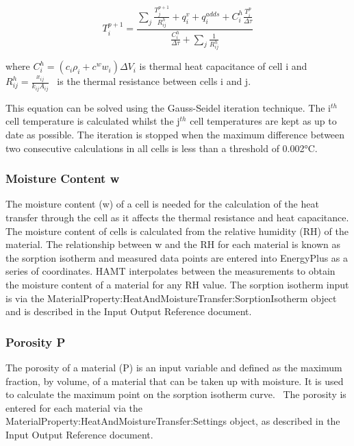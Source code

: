 \begin{equation}
T_i^{p + 1} = \frac{{\sum\nolimits_j {\frac{{T_j^{p + 1}}}{{R_{ij}^h}}}  + q_i^v + q_i^{adds} + C_i^h\frac{{T_i^p}}{{\Delta \tau }}}}{{\frac{{C_i^h}}{{\Delta \tau }} + \sum\nolimits_j {\frac{1}{{R_{ij}^h}}} }}
\label{eq:TemperatureIthCell}
\end{equation}

where \(C_i^h = \left( {{c_i}{\rho_i} + {c^w}{w_i}} \right)\Delta {V_i}\) is thermal heat capacitance of cell i and \(R_{ij}^h = \frac{x_{ij}}{k_{ij}A_{ij}}\) ~is the thermal resistance between cells i and j.

This equation can be solved using the Gauss-Seidel iteration technique. The i\(^{th}\) cell temperature is calculated whilst the j\(^{th}\) cell temperatures are kept as up to date as possible. The iteration is stopped when the maximum difference between two consecutive calculations in all cells is less than a threshold of 0.002°C.

\subsubsection{Moisture Content w}\label{moisture-content-w}

The moisture content (w) of a cell is needed for the calculation of the heat transfer through the cell as it affects the thermal resistance and heat capacitance. The moisture content of cells is calculated from the relative humidity (RH) of the material. The relationship between w and the RH for each material is known as the sorption isotherm and measured data points are entered into EnergyPlus as a series of coordinates. HAMT interpolates between the measurements to obtain the moisture content of a material for any RH value. The sorption isotherm input is via the MaterialProperty:HeatAndMoistureTransfer:SorptionIsotherm object and is described in the Input Output Reference document.

\subsubsection{Porosity P}\label{porosity-p}

The porosity of a material (P) is an input variable and defined as the maximum fraction, by volume, of a material that can be taken up with moisture. It is used to calculate the maximum point on the sorption isotherm curve. ~The porosity is entered for each material via the MaterialProperty:HeatAndMoistureTransfer:Settings object, as described in the Input Output Reference document.


